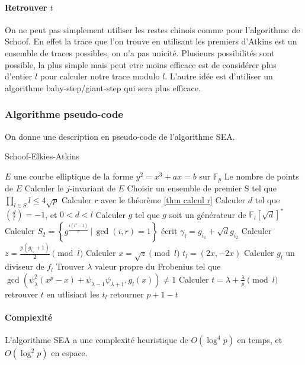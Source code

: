 \documentclass[12pt]{article}
\begin{document}
\paragraph*{Retrouver $t$}
On ne peut pas simplement utiliser les restes chinois comme pour l'algorithme de Schoof. En effet la trace que l'on trouve en utilisant les premiers d'Atkins est un ensemble de traces possibles, on n'a pas unicité. Plusieurs possibilités sont possible, la plus simple mais peut etre moins efficace est de considérer plus d'entier $l$ pour calculer notre trace modulo $l$. L'autre idée est d'utiliser un algorithme baby-step/giant-step qui sera plus efficace.

\newpage
\subsubsection{Algorithme pseudo-code}
On donne une description en pseudo-code de l'algorithme SEA.
\begin{algorithm}
\caption{Schoof-Elkies-Atkins}
\begin{algorithmic}
\REQUIRE $E$ une courbe elliptique de la forme $y^2 = x^3 + ax = b$ sur $\mathbb{F}_p$
\ENSURE Le nombre de points de $E$
\STATE Calculer le $j$-invariant de $E$
\STATE Choisir un ensemble de premier S tel que $\prod_{l \in S}l \leq 4\sqrt{p}$
\STATE Calculer $r$ avec le théorème \ref{thm calcul r}
\STATE Calculer $d$ tel que $(\frac{d}{l}) = -1$, et $0<d<l$
\STATE Calculer $g$ tel que $g$ soit un générateur de $\mathbb{F}_l[\sqrt{d}]^*$
\STATE Calculer $S_2 = \left\{g^{\frac{i(l^2-1)}{r}} \, | \, \gcd(i,r) = 1 \right\}$
\STATE écrit $\gamma_i = g_{i_1} + \sqrt{d}g_{i_2}$
\STATE Calculer $z= \frac{p(g_{i_1} +1)}{2} \pmod l$
\STATE Calculer $x = \sqrt{z} \pmod l$
\STATE $t_l = (2x,-2x)$
\ENDIF
\ENDFOR
\ELSE
\STATE Calculer $g_l$ un diviseur de $f_l$
\STATE Trouver $\lambda$ valeur propre du Frobenius tel que $\gcd(\psi_{\lambda}^2(x^p-x) + \psi_{\lambda-1}\psi_{\lambda+1}, g_l(x)) \ne 1$
\STATE Calculer $t = \lambda + \frac{\lambda}{p} \pmod l$
\ENDIF
\ENDFOR
\STATE retrouver $t$ en utlisiant les $t_l$ 
\STATE retourner $p+1-t$
\end{algorithmic}
\end{algorithm}

\paragraph*{Complexité}
L'algorithme SEA a une complexité heuristique de $O(\log^4 p)$ en temps, et $O(\log^2 p)$ en espace.

\newpage


\end{document}
